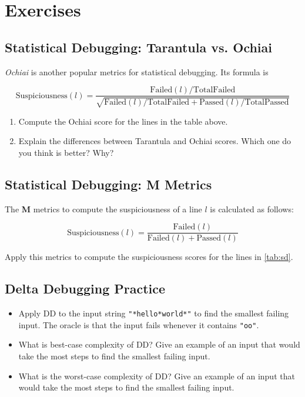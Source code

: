 \documentclass[oneside,11pt,dvipsnames]{book}
\newenvironment{centerdisplay}[1][]{
  \small
  \centering
  \begin{mycenterdisplay}
    {\small \textbf{#1}}
  }{
  \end{mycenterdisplay}
}
\newcommand{\code}[1]{\texttt{#1}}
\begin{document}
\section{Exercises}

\subsection{Statistical Debugging: Tarantula vs. Ochiai}

\emph{Ochiai} is another popular metrics for statistical debugging. Its formula is

\begin{centerdisplay}
\[
\text{Suspiciousness}(l) = \frac{\text{Failed}(l) / \text{TotalFailed}}{\sqrt{\text{Failed}(l) / \text{TotalFailed} + \text{Passed}(l) / \text{TotalPassed}}}
\]
\end{centerdisplay}


\begin{enumerate}
    \item Compute the Ochiai score for the lines in the table above.
    \item Explain the differences between Tarantula and Ochiai scores. Which one do you think is better? Why?
\end{enumerate}



\subsection{Statistical Debugging: M Metrics}

The \textbf{M} metrics to compute the suspiciousness of a line $l$ is calculated as follows:
\begin{centerdisplay}
\[
\text{Suspiciousness}(l) = \frac{\text{Failed}(l)}{\text{Failed}(l) + \text{Passed}(l)}
\]
\end{centerdisplay}

Apply this metrics to compute the suspiciousness scores for the lines in \autoref{tab:sd}.

\subsection{Delta Debugging Practice}
\begin{itemize}
    \item Apply DD to the input string \code{"*hello*world*"} to find the smallest failing input. The oracle is that the input fails whenever it contains \code{"oo"}.
    \item What is best-case complexity of DD? Give an example of an input that would take the most steps to find the smallest failing input.
    \item What is the worst-case complexity of DD? Give an example of an input that would take the most steps to find the smallest failing input.
\end{itemize}
\end{document}
